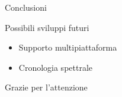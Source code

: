 \documentclass[10pt, xetex]{beamer}
\begin{document}
\begin{frame}{Conclusioni}
    \begin{block}{Possibili sviluppi futuri}
        \begin{itemize}
            \item Supporto multipiattaforma
            \item Cronologia spettrale
        \end{itemize}
    \end{block}
    
    \pause
    \begin{center}
        \Large Grazie per l'attenzione
    \end{center}
\end{frame}
 
\end{document}
